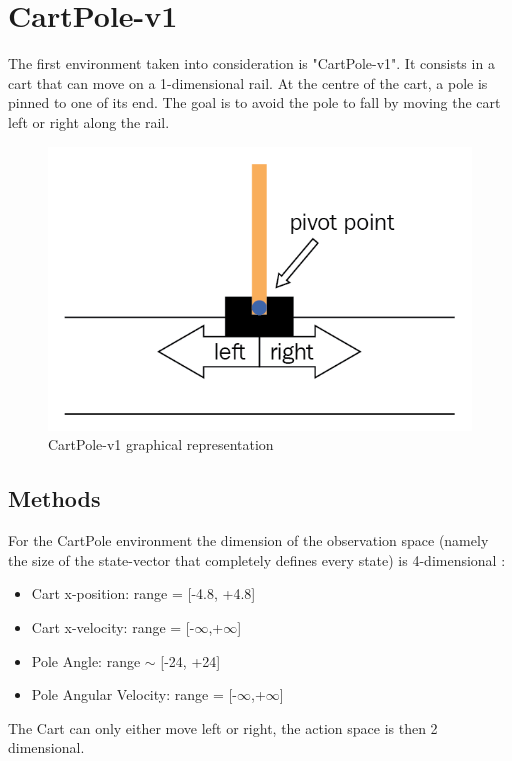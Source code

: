\documentclass[11pt,a4paper,twocolumn]{IEEEtran}
\begin{document}
	\section{\textbf{CartPole-v1}}
		The first environment taken into consideration is "CartPole-v1". It consists in a cart that can move on a 1-dimensional rail. At the centre of the cart, a pole is pinned to one of its end. The goal is to avoid the pole to fall by moving the cart left or right along the rail.
		\begin{figure}[h]
			\centering
			\includegraphics[width=0.75\linewidth]{../imgs/cartpole}
			\caption{CartPole-v1 graphical representation}
		\end{figure}
		\subsection{\textbf{Methods}}
		For the CartPole environment the dimension of the observation space (namely the size of the state-vector that completely defines every state) is 4-dimensional \cite{GHCP}:
		\begin{itemize}
			\item Cart x-position: range = [-4.8, +4.8]
			\item Cart x-velocity: range = [-$\infty$,+$\infty$]
			\item Pole Angle: range $\sim$ [-24\textdegree , +24\textdegree]
			\item Pole Angular Velocity: range = [-$\infty$,+$\infty$]
		\end{itemize}
		The Cart can only either move left or right, the action space is then 2 dimensional.\medskip\\
		
\end{document}
